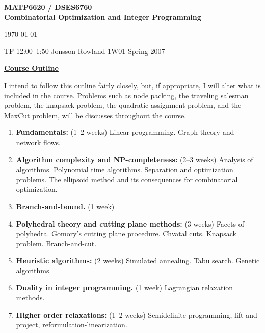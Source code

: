 \documentclass{article}
\begin{document}
\begin{center}
  {\bf\large\bf  MATP6620 / DSES6760  \\
     Combinatorial Optimization and Integer Programming}
\end{center}
\begin{flushright} \today \end{flushright}

\begin{flushright}  TF	 12:00--1:50 Jonsson-Rowland 1W01
       \hspace*{\fill}   Spring 2007  \end{flushright}

\begin{flushleft}  \underline{\bf Course Outline}  \end{flushleft}

I intend to follow this outline fairly closely,
but, if appropriate, I will alter what is included in the course.
Problems such as node packing, the traveling salesman problem,
the knapsack problem,
the quadratic assignment problem, and the MaxCut problem, will be
discusses throughout the course.

\begin{enumerate}
  \item  {\bf Fundamentals:}  (1--2 weeks)
           Linear programming. Graph theory and network flows.
  \item  {\bf Algorithm complexity and NP-completeness:}  (2--3 weeks)
           Analysis of algorithms.  Polynomial time algorithms.  Separation
           and optimization problems.  The ellipsoid method and its
           consequences for combinatorial optimization.
  \item  {\bf Branch-and-bound.}  (1 week)
  \item  {\bf Polyhedral theory and cutting plane methods:}  (3 weeks)
           Facets of polyhedra.
           Gomory's cutting plane procedure.  Chvatal cuts.  Knapsack problem.
           Branch-and-cut.
  \item  {\bf Heuristic algorithms:} (2 weeks)
           Simulated annealing. Tabu search. Genetic algorithms.
  \item  {\bf Duality in integer programming.}  (1 week)
           Lagrangian relaxation methods.
  \item {\bf Higher order relaxations:} (1--2 weeks)
           Semidefinite programming, lift-and-project, reformulation-linearization.
\end{enumerate}
\end{document}
